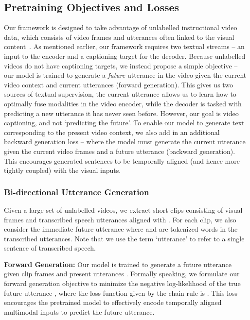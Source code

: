 \documentclass[10pt,twocolumn,letterpaper]{article}
\begin{document}
 
\subsection{Pretraining Objectives and Losses} 
Our framework is designed to take advantage of unlabelled instructional video data, which consists of video frames and utterances often linked to the visual content~\cite{miech2019howto100m}.
As mentioned earlier, our framework requires two textual streams -- an input to the encoder and a captioning target for the decoder. Because unlabelled videos do not have captioning targets, 
we instead propose a simple objective -- our model is trained to generate a \textit{future} utterance in the video given the current video context and current utterances (forward generation). This gives us two sources of textual supervision, the current utterance allows us to learn how to optimally fuse modalities in the video encoder, while the decoder is tasked with predicting a new utterance it has never seen before. However, our goal is video captioning, and not `predicting the future'. 
To enable our model to generate text corresponding to the present video context, we also add in an additional backward generation loss -- where the model must generate the current utterance given the current video frames and a future utterance (backward generation). This encourages generated sentences to be temporally aligned (and hence more tightly coupled) with the visual inputs.



\subsubsection{Bi-directional Utterance Generation} 
Given a large set of unlabelled videos, we extract short clips consisting of visual frames  and transcribed speech utterances  aligned with . For each clip, we also consider the immediate future utterance  where  and  are tokenized words in the transcribed utterances. 
Note that we use the term `utterance' to refer to a single sentence of transcribed speech. 
	
\noindent\textbf{Forward Generation:}
Our model is trained to generate a future utterance  given clip frames  and present utterances .
Formally speaking, we formulate our forward generation objective to minimize the negative log-likelihood of the true future utterance , where the loss function given by the chain rule is .
This loss encourages the pretrained model to effectively encode temporally aligned multimodal inputs to predict the future utterance.
\end{document}
